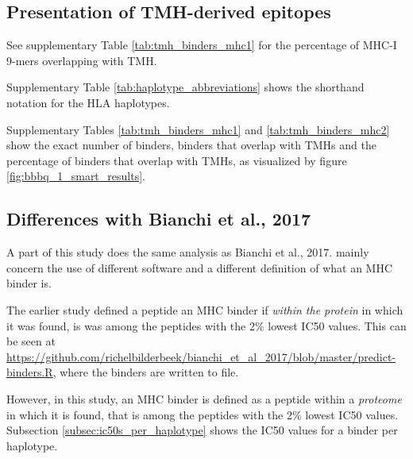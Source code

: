 \subsection{Presentation of TMH-derived epitopes}

See supplementary Table \ref{tab:tmh_binders_mhc1} 
for the percentage of MHC-I 9-mers overlapping with TMH.



Supplementary Table \ref{tab:haplotype_abbreviations} shows the
shorthand notation for the HLA haplotypes.



Supplementary Tables \ref{tab:tmh_binders_mhc1} and \ref{tab:tmh_binders_mhc2}
show the exact number of binders, binders that overlap with TMHs
and the percentage of binders that overlap with TMHs, as
visualized by figure \ref{fig:bbbq_1_smart_results}.

\clearpage

\subsection{Differences with Bianchi et al., 2017}

A part of this study does the same analysis as Bianchi et al., 2017.
mainly concern the use of different
software and a different definition of what an MHC binder is.


The earlier study defined a peptide an MHC binder 
if \emph{within the protein} in which it was found, 
is was among the peptides with the 2\% lowest IC50 values.
This can be seen at \url{https://github.com/richelbilderbeek/bianchi_et_al_2017/blob/master/predict-binders.R},
where the binders are written to file.

However, in this study, an MHC binder is defined as a peptide within a \emph{proteome} in which it is found, that is among the peptides with the 2\% lowest IC50 values.
Subsection \ref{subsec:ic50s_per_haplotype} shows the IC50 values
for a binder per haplotype. 

